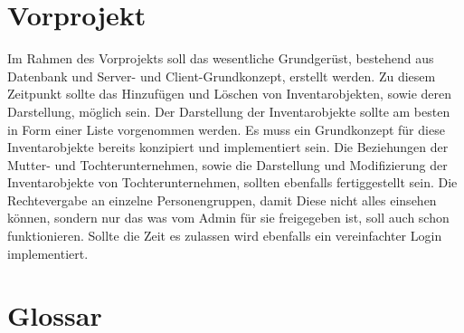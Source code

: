 \documentclass[11pt,a4paper]{report}
\begin{document}
\section{Vorprojekt}
Im Rahmen des Vorprojekts soll das wesentliche Grundgerüst, bestehend aus Datenbank und Server- und Client-Grundkonzept, erstellt werden. Zu diesem Zeitpunkt sollte das Hinzufügen und Löschen von Inventarobjekten, sowie deren Darstellung, möglich sein. Der Darstellung der Inventarobjekte sollte am besten in Form einer Liste vorgenommen werden.
Es muss ein Grundkonzept für diese Inventarobjekte bereits konzipiert und implementiert sein. Die Beziehungen der Mutter- und Tochterunternehmen, sowie die Darstellung und Modifizierung der Inventarobjekte von Tochterunternehmen, sollten ebenfalls fertiggestellt sein. Die Rechtevergabe an einzelne Personengruppen, damit Diese nicht alles einsehen können, sondern nur das was vom Admin für sie freigegeben ist, soll auch schon funktionieren. Sollte die Zeit es zulassen wird ebenfalls ein vereinfachter Login implementiert.

\section{Glossar}
\end{document}
